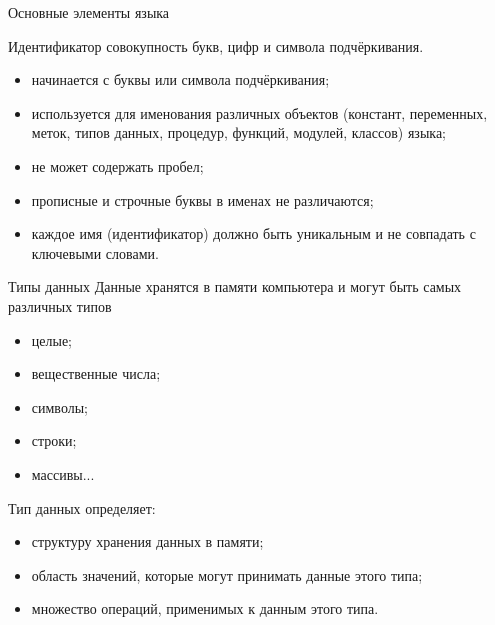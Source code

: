 \documentclass{beamer}
\begin{document}
\begin{frame}{Основные элементы языка}
\begin{block}{Идентификатор}
совокупность букв, цифр и символа подчёркивания. 
\end{block}
\begin{itemize}
\item начинается с буквы или символа подчёркивания;
\item используется для именования различных объектов (констант, переменных, меток, типов данных, процедур, функций, модулей, классов) языка;
\item не может содержать пробел;
\item прописные и строчные буквы в именах не различаются;
\item каждое имя (идентификатор) должно быть уникальным и не совпадать
с ключевыми словами.
\end{itemize}
\end{frame}

\begin{frame}{Типы данных}
Данные хранятся в памяти компьютера и могут быть самых различных
типов
\begin{itemize}
\item целые;
\item вещественные числа;
\item символы;
\item строки;
\item массивы...  
\end{itemize}
Тип данных определяет:
\begin{itemize}
\item структуру хранения данных в памяти;
\item область значений, которые могут принимать данные этого типа;
\item множество операций, применимых к данным этого типа. 
\end{itemize}
\end{frame}
\end{document}
